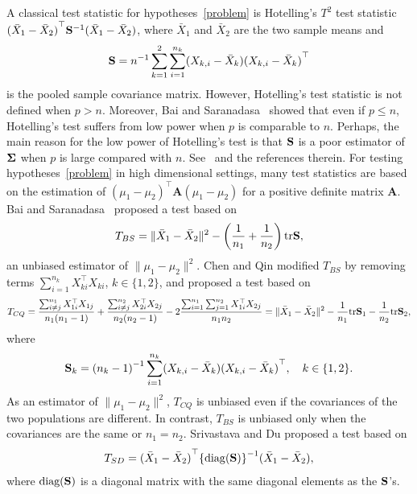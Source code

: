 \documentclass[times,sort&compress,3p]{elsarticle}
\newcommand{\mytr}{ {\rm tr} }
\newcommand{\BA}{\mathbf{A}}    \newcommand{\BB}{\mathbf{B}}    \newcommand{\BC}{\mathbf{C}}    \newcommand{\BD}{\mathbf{D}}    \newcommand{\BE}{\mathbf{E}}    \newcommand{\BF}{\mathbf{F}}    \newcommand{\BG}{\mathbf{G}}    \newcommand{\BH}{\mathbf{H}}    \newcommand{\BI}{\mathbf{I}}    \newcommand{\BJ}{\mathbf{J}}    \newcommand{\BK}{\mathbf{K}}    \newcommand{\BL}{\mathbf{L}}
\theoremstyle{plain}
\theoremstyle{definition}
\theoremstyle{remark}
\begin{document}
A classical test statistic for hypotheses~\eqref{problem} is Hotelling's $T^2$ test  statistic ${(\bar{X}_1-\bar{X}_2)}^\top  \mathbf{S}^{-1}(\bar{X}_1-\bar{X}_2)$, where $\bar{X}_1$ and $\bar{X}_2$ are the two sample means and
\begin{equation*}
    \mathbf{S}=
n^{-1}\sum_{k=1}^2\sum_{i=1}^{n_k} (X_{k,i}-\bar{X}_k) {(X_{k,i}-\bar{X}_k)}^\top 
\end{equation*}
is the pooled sample covariance matrix.
However, Hotelling's test statistic is not defined when $p>n$.
Moreover, Bai and Saranadasa~\cite{Bai1996Efiect} showed that even if $p\leq n$, Hotelling's test suffers from low power when $p$ is comparable to $n$.
Perhaps, the main reason for the low power of Hotelling's test is that $\mathbf{S}$ is a poor estimator of $\boldsymbol{\Sigma}$ when $p$ is large compared with $n$.
See~\cite{Chen2010A} and the references therein.
For testing hypotheses~\eqref{problem} in high dimensional settings,  
many test statistics are based on the estimation of  ${(\mu_1-\mu_2)}^\top  \BA(\mu_1-\mu_2)$ for a positive definite matrix $\BA$. Bai and Saranadasa~\cite{Bai1996Efiect} proposed a test based on
\begin{equation*}
    T_{BS}=\|\bar{X}_1-\bar{X}_2\|^2-\left(\frac{1}{n_1}+\frac{1}{n_2}\right)\mytr \BS,
\end{equation*}
an unbiased estimator of $\|\mu_1-\mu_2\|^2$.
Chen and Qin \cite{Chen2010A} modified $T_{BS}$ by removing terms $\sum_{i=1}^{n_k}X_{ki}^\top  X_{ki}$, $k\in\{1,2\}$, and proposed a test based on
\begin{equation*}
        T_{CQ}=\frac{\sum_{i\neq j}^{n_1}X_{1i}^\top  X_{1j}}{n_1(n_1-1)}+\frac{\sum_{i\neq j}^{n_2}X_{2i}^\top  X_{2j}}{n_2(n_2-1)}-2\frac{\sum_{i=1}^{n_1}\sum_{j=1}^{n_2}X_{1i}^\top  X_{2j}}{n_1n_2}
            =\|\bar{X}_1-\bar{X}_2\|^2-\frac{1}{n_1}\mytr \BS_1-\frac{1}{n_2}\mytr \BS_2,
\end{equation*}
where
\begin{equation*}
\mathbf{S}_k={(n_k -1)}^{-1}\sum_{i=1}^{n_k} (X_{k,i}-\bar{X}_k) {(X_{k,i}-\bar{X}_k)}^\top 
, \quad k\in\{1,2\}.
\end{equation*}
As an estimator of $\|\mu_1-\mu_2\|^2$, $T_{CQ}$ is unbiased even if the covariances of the two populations are different.
In contrast, $T_{BS}$ is unbiased only when the covariances are the same or $n_1=n_2$.
Srivastava and Du \cite{Srivastava2008A} proposed a test based on
\begin{equation*}
    T_{SD}={(\bar{X}_1-\bar{X}_2)}^\top  {\{\mathrm{diag}(\mathbf{S})\}}^{-1}(\bar{X}_1-\bar{X}_2),
\end{equation*}
where $\textrm{diag} (\mathbf{S})$ is a diagonal matrix with the same diagonal elements as the $\mathbf{S}$'s.
\end{document}
